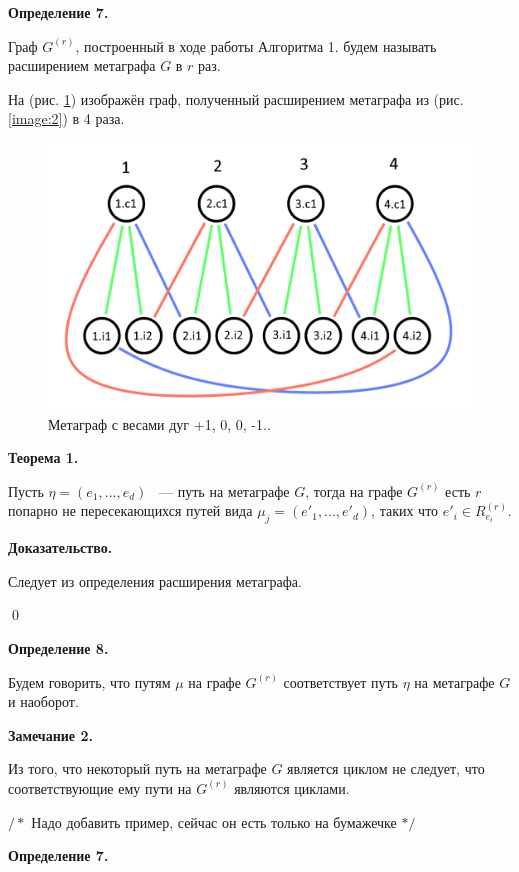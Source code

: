 \documentclass[14pt]{mmcs-article}
\begin{document}
\textbf{Определение 7.}

Граф $G^{(r)}$, построенный в ходе работы Алгоритма 1. будем называть расширением метаграфа $G$ в $r$ раз.

На (рис. \ref{image:3}) изображён граф, полученный расширением метаграфа из (рис. \ref{image:2}) в 4 раза.

\begin{figure}[H]
    \centering
    \includegraphics[scale=0.4]{Fig_1.png}
    \caption{ Метаграф с весами дуг +1, 0, 0, -1.. }
    \label{image:3}
\end{figure}

\textbf{Теорема 1.}

Пусть $\eta = (e_1, ..., e_d)$ ~--- путь на метаграфе $G$, тогда на графе $G^{(r)}$ есть $r$ попарно не пересекающихся путей вида $\mu_j = (e'_1, ..., e'_d)$, таких что $e'_i \in R^{(r)}_{e_i}$.

\textbf{Доказательство.}


Следует из определения расширения метаграфа.

\qed

\textbf{Определение 8.}

Будем говорить, что путям $\mu$ на графе $G^{(r)}$ соответствует путь $\eta$ на метаграфе $G$ и наоборот.

\textbf{Замечание 2.}

Из того, что некоторый путь на метаграфе $G$ является циклом не следует, что соответствующие ему пути на $G^{(r)}$ являются циклами.

$/*$ Надо добавить пример, сейчас он есть только на бумажечке $*/$

\textbf{Определение 7.}
\end{document}
